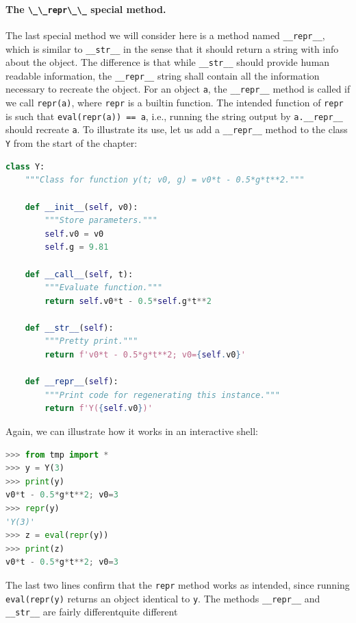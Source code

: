 \documentclass[graybox,envcountchap,sectrefs,final]{svmonodo}
\begin{document}
\paragraph{The \protect\Verb!\_\_repr\_\_! special method.}
The last special method we will consider here is a method named \Verb!__repr__!, which is similar to \Verb!__str__! in the sense
that it should return a string with info about the object. The difference is that while \Verb!__str__! should provide
human readable information, the \Verb!__repr__! string shall contain all the information necessary to recreate the object. For an
object \texttt{a}, the \Verb!__repr__! method is called if we call \texttt{repr(a)}, where \texttt{repr} is a builtin function. The intended function
of \texttt{repr} is such that \texttt{eval(repr(a)) == a}, i.e., running the string output by \Verb!a.__repr__! should recreate \texttt{a}.
To illustrate its use, let us add a \Verb!__repr__! method to the class \texttt{Y} from the start of the chapter:
\begin{lstlisting}[language=Python,style=blue1]
class Y:
    """Class for function y(t; v0, g) = v0*t - 0.5*g*t**2."""

    def __init__(self, v0):
        """Store parameters."""
        self.v0 = v0
        self.g = 9.81

    def __call__(self, t):
        """Evaluate function."""
        return self.v0*t - 0.5*self.g*t**2

    def __str__(self):
        """Pretty print."""
        return f'v0*t - 0.5*g*t**2; v0={self.v0}'

    def __repr__(self):
        """Print code for regenerating this instance."""
        return f'Y({self.v0})'
\end{lstlisting}
Again, we can illustrate how it works in an interactive shell:
\begin{lstlisting}[language=Python,style=blue1]
>>> from tmp import *
>>> y = Y(3)
>>> print(y)
v0*t - 0.5*g*t**2; v0=3
>>> repr(y)
'Y(3)'
>>> z = eval(repr(y))
>>> print(z)
v0*t - 0.5*g*t**2; v0=3
\end{lstlisting}
The last two lines confirm that the \texttt{repr} method works as intended, since running \texttt{eval(repr(y)} returns an object
identical to \texttt{y}. The methods \Verb!__repr__! and \Verb!__str__! are fairly differentquite different
\end{document}

